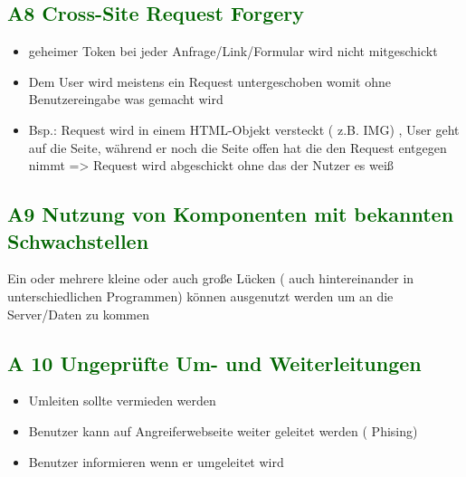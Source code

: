 \subsection*{\textcolor{darkgreen}{A8 Cross-Site Request Forgery}}

\begin{itemize}
	\item geheimer Token bei jeder Anfrage/Link/Formular wird nicht mitgeschickt
	\item Dem User wird meistens ein Request untergeschoben womit ohne Benutzereingabe was gemacht wird
	\item Bsp.: Request wird in einem HTML-Objekt versteckt ( z.B. IMG) , User geht auf die Seite, während er noch die Seite offen hat die den Request entgegen nimmt => Request wird abgeschickt ohne das der Nutzer es weiß
\end{itemize}

\subsection*{\textcolor{darkgreen}{A9 Nutzung von Komponenten mit bekannten Schwachstellen}}

 Ein oder mehrere kleine oder auch große Lücken ( auch hintereinander in unterschiedlichen Programmen) können ausgenutzt werden um an die Server/Daten zu kommen
 
\subsection*{\textcolor{darkgreen}{A 10 Ungeprüfte Um- und Weiterleitungen}}

\begin{itemize}
	\item Umleiten sollte vermieden werden
	\item Benutzer kann auf Angreiferwebseite weiter geleitet werden ( Phising)
	\item Benutzer informieren wenn er umgeleitet wird
\end{itemize}
